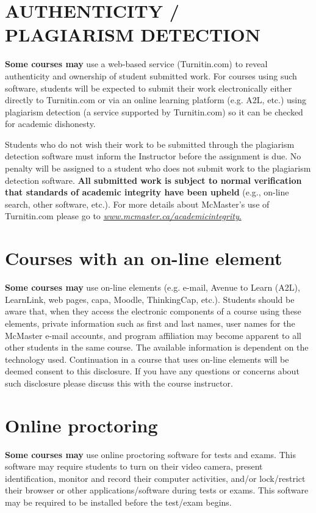 \documentclass[12pt]{article}
\begin{document}
\section*{AUTHENTICITY / PLAGIARISM DETECTION}

\textbf{Some courses may} use a web-based service (Turnitin.com)
to reveal authenticity and ownership of student submitted work. For
courses using such software, students will be expected to submit their
work electronically either directly to Turnitin.com or via an online
learning platform (e.g. A2L, etc.) using plagiarism detection (a service
supported by Turnitin.com) so it can be checked for academic dishonesty.

Students who do not wish their work to be submitted through the
plagiarism detection software must inform the Instructor before the
assignment is due. No penalty will be assigned to a student who does not
submit work to the plagiarism detection software. \textbf{All submitted
work is subject to normal verification that standards of academic
integrity have been upheld} (e.g., on-line search, other software,
etc.). For more details about McMaster's use of Turnitin.com please go
to
\href{http://www.mcmaster.ca/academicintegrity}{\emph{www.mcmaster.ca/academicintegrity}.}

\section*{Courses with an on-line element}

\textbf{Some courses may} use on-line elements (e.g. e-mail,
Avenue to Learn (A2L), LearnLink, web pages, capa, Moodle, ThinkingCap,
etc.). Students should be aware that, when they access the electronic
components of a course using these elements, private information such as
first and last names, user names for the McMaster e-mail accounts, and
program affiliation may become apparent to all other students in the
same course. The available information is dependent on the technology
used. Continuation in a course that uses on-line elements will be deemed
consent to this disclosure. If you have any questions or concerns about
such disclosure please discuss this with the course instructor.

\section*{Online proctoring}

\textbf{Some courses may} use online proctoring software for tests and
exams. This software may require students to turn on their video camera,
present identification, monitor and record their computer activities,
and/or lock/restrict their browser or other applications/software during
tests or exams. This software may be required to be installed before the
test/exam begins.
\end{document}

